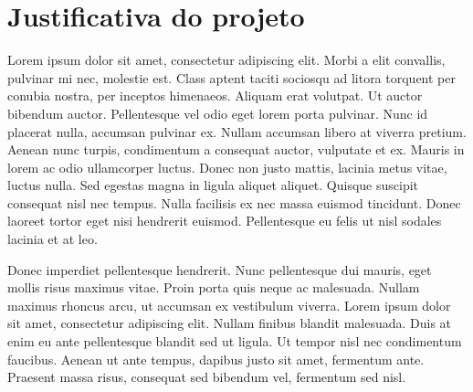 \section{Justificativa do projeto}
Lorem ipsum dolor sit amet, consectetur adipiscing elit. Morbi a elit convallis, pulvinar mi nec, molestie est. Class aptent taciti sociosqu ad litora torquent per conubia nostra, per inceptos himenaeos. Aliquam erat volutpat. Ut auctor bibendum auctor. Pellentesque vel odio eget lorem porta pulvinar. Nunc id placerat nulla, accumsan pulvinar ex. Nullam accumsan libero at viverra pretium. Aenean nunc turpis, condimentum a consequat auctor, vulputate et ex. Mauris in lorem ac odio ullamcorper luctus. Donec non justo mattis, lacinia metus vitae, luctus nulla. Sed egestas magna in ligula aliquet aliquet. Quisque suscipit consequat nisl nec tempus. Nulla facilisis ex nec massa euismod tincidunt. Donec laoreet tortor eget nisi hendrerit euismod. Pellentesque eu felis ut nisl sodales lacinia et at leo.

Donec imperdiet pellentesque hendrerit. Nunc pellentesque dui mauris, eget mollis risus maximus vitae. Proin porta quis neque ac malesuada. Nullam maximus rhoncus arcu, ut accumsan ex vestibulum viverra. Lorem ipsum dolor sit amet, consectetur adipiscing elit. Nullam finibus blandit malesuada. Duis at enim eu ante pellentesque blandit sed ut ligula. Ut tempor nisl nec condimentum faucibus. Aenean ut ante tempus, dapibus justo sit amet, fermentum ante. Praesent massa risus, consequat sed bibendum vel, fermentum sed nisl.
